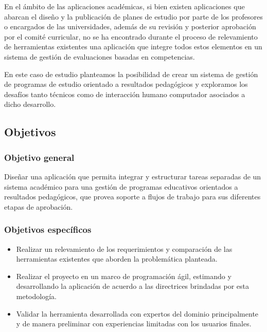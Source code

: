 En el ámbito de las aplicaciones académicas, si bien existen aplicaciones que abarcan el diseño y la publicación de planes de estudio por parte de los profesores o encargados de las universidades, además de su revisión y posterior aprobación por el comité curricular, no se ha encontrado durante el proceso de relevamiento de herramientas existentes una aplicación que integre todos estos elementos en un sistema de gestión de evaluaciones basadas en competencias\citep{curricunet_webpage}\citep{courseleaf_webpage}\citep{deca_webpage}.
 
En este caso de estudio\citep{runeson2012case} planteamos la posibilidad de crear un sistema de gestión de programas de estudio orientado a resultados pedagógicos y exploramos los desafíos tanto técnicos como de interacción humano computador asociados a dicho desarrollo.

\subsection{Objetivos}
\subsubsection{Objetivo general}
Diseñar una aplicación que permita integrar y estructurar tareas separadas de un sistema académico para una gestión de programas educativos orientados a resultados pedagógicos, que provea soporte a flujos de trabajo para sus diferentes etapas de aprobación.

\subsubsection{Objetivos específicos}
  \begin{itemize}
    \item Realizar un relevamiento de los requerimientos y comparación de las herramientas existentes que aborden la problemática planteada.
    \item Realizar el proyecto en un marco de programación ágil, estimando y desarrollando la aplicación de acuerdo a las directrices brindadas por esta metodología.
    \item Validar la herramienta desarrollada con expertos del dominio principalmente y de manera preliminar con experiencias limitadas con los usuarios finales.
  \end{itemize}
